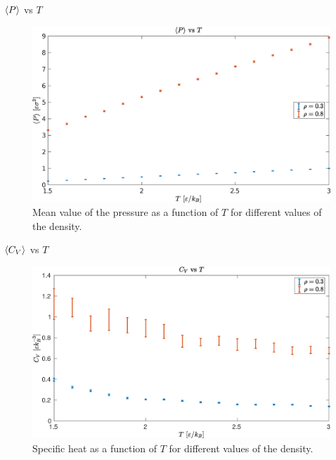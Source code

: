 \documentclass[10pt, compress, protectframetitle, handout]{beamer}
\begin{document}
\begin{frame}{$\Braket{P}$ vs $T$}
	\begin{figure}
		\centering
		\includegraphics[width=\textwidth]{P_vs_T}
		\caption{Mean value of the pressure as a function of $T$ for different values of the density.}
		\label{fig:P_vs_T}
	\end{figure}
\end{frame}

\begin{frame}{$\Braket{C_V}$ vs $T$}
	\begin{figure}
		\centering
		\includegraphics[width=\textwidth]{Cv_vs_T}
		\caption{Specific heat as a function of $T$ for different values of the density.}
		\label{fig:Cv_vs_T}
	\end{figure}
\end{frame}
\end{document}
